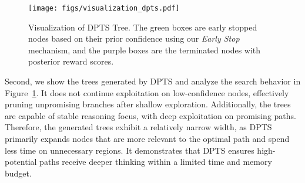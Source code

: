 \begin{figure}
    \centering
    \texttt{[image: figs/visualization\_dpts.pdf]}
    \vspace{-0.2in}
    \caption{Visualization of DPTS Tree. The green boxes are early stopped nodes based on their prior confidence using our \textit{Early Stop} mechanism, and the purple boxes are the terminated nodes with posterior reward scores. }
    \vspace{-0.12in}
    \label{fig:dpts_tree}
\end{figure}

Second, we show the trees generated by DPTS and analyze the search behavior in Figure~\ref{fig:dpts_tree}. It does not continue exploitation on low-confidence nodes, effectively pruning unpromising branches after shallow exploration. 
Additionally, the trees are capable of stable reasoning focus, with deep exploitation on promising paths. 
Therefore, the generated trees exhibit a relatively narrow width, as DPTS primarily expands nodes that are more relevant to the optimal path and spend less time on unnecessary regions. 
It demonstrates that DPTS 
ensures high-potential paths receive deeper thinking within a limited time and memory budget. 

